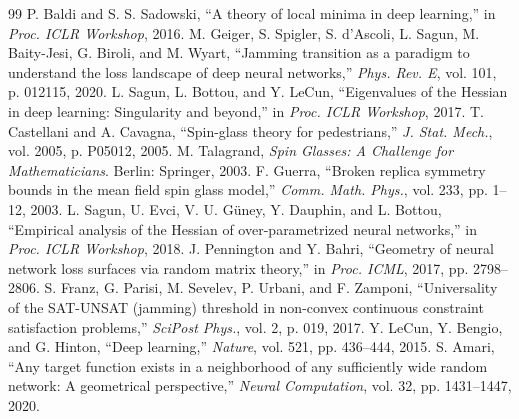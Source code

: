 \documentclass[12pt,a4paper]{article}
\begin{document}
\begin{thebibliography}{99}
P. Baldi and S. S. Sadowski, ``A theory of local minima in deep learning,'' in \emph{Proc. ICLR Workshop}, 2016.
M. Geiger, S. Spigler, S. d'Ascoli, L. Sagun, M. Baity-Jesi, G. Biroli, and M. Wyart, ``Jamming transition as a paradigm to understand the loss landscape of deep neural networks,'' \emph{Phys. Rev. E}, vol. 101, p. 012115, 2020.
L. Sagun, L. Bottou, and Y. LeCun, ``Eigenvalues of the Hessian in deep learning: Singularity and beyond,'' in \emph{Proc. ICLR Workshop}, 2017.
T. Castellani and A. Cavagna, ``Spin-glass theory for pedestrians,'' \emph{J. Stat. Mech.}, vol. 2005, p. P05012, 2005.
M. Talagrand, \emph{Spin Glasses: A Challenge for Mathematicians}. Berlin: Springer, 2003.
F. Guerra, ``Broken replica symmetry bounds in the mean field spin glass model,'' \emph{Comm. Math. Phys.}, vol. 233, pp. 1--12, 2003.
L. Sagun, U. Evci, V. U. G\"uney, Y. Dauphin, and L. Bottou, ``Empirical analysis of the Hessian of over-parametrized neural networks,'' in \emph{Proc. ICLR Workshop}, 2018.
J. Pennington and Y. Bahri, ``Geometry of neural network loss surfaces via random matrix theory,'' in \emph{Proc. ICML}, 2017, pp. 2798--2806.
S. Franz, G. Parisi, M. Sevelev, P. Urbani, and F. Zamponi, ``Universality of the SAT-UNSAT (jamming) threshold in non-convex continuous constraint satisfaction problems,'' \emph{SciPost Phys.}, vol. 2, p. 019, 2017.
Y. LeCun, Y. Bengio, and G. Hinton, ``Deep learning,'' \emph{Nature}, vol. 521, pp. 436--444, 2015.
S. Amari, ``Any target function exists in a neighborhood of any sufficiently wide random network: A geometrical perspective,'' \emph{Neural Computation}, vol. 32, pp. 1431--1447, 2020.
\end{thebibliography}
\end{document}
